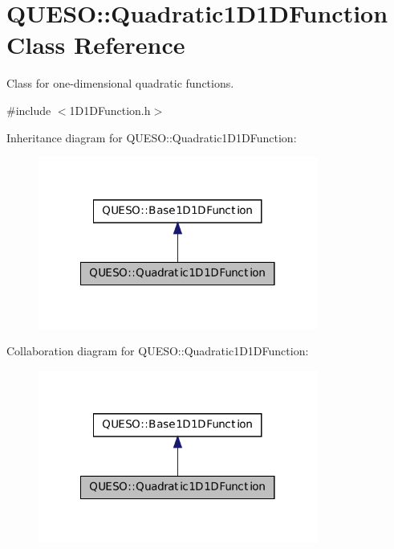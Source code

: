 \hypertarget{class_q_u_e_s_o_1_1_quadratic1_d1_d_function}{\section{Q\-U\-E\-S\-O\-:\-:Quadratic1\-D1\-D\-Function Class Reference}
\label{class_q_u_e_s_o_1_1_quadratic1_d1_d_function}
}


Class for one-\/dimensional quadratic functions.  




{\ttfamily \#include $<$1\-D1\-D\-Function.\-h$>$}



Inheritance diagram for Q\-U\-E\-S\-O\-:\-:Quadratic1\-D1\-D\-Function\-:
\nopagebreak
\begin{figure}[H]
\begin{center}
\leavevmode
\includegraphics[width=260pt]{class_q_u_e_s_o_1_1_quadratic1_d1_d_function__inherit__graph}
\end{center}
\end{figure}


Collaboration diagram for Q\-U\-E\-S\-O\-:\-:Quadratic1\-D1\-D\-Function\-:
\nopagebreak
\begin{figure}[H]
\begin{center}
\leavevmode
\includegraphics[width=260pt]{class_q_u_e_s_o_1_1_quadratic1_d1_d_function__coll__graph}
\end{center}
\end{figure}
